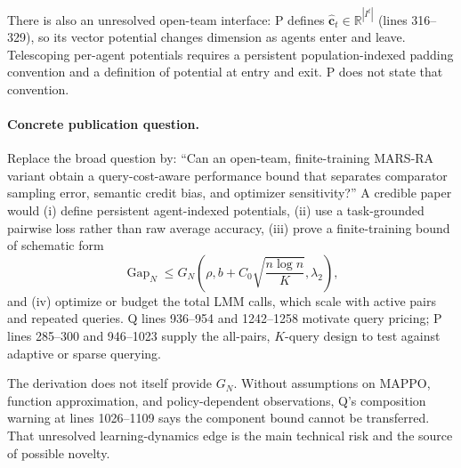 \documentclass{article}
\begin{document}
There is also an unresolved open-team interface: P defines
\(\widehat{\mathbf c}_t\in\mathbb R^{|I^t|}\) (lines 316--329), so its vector
potential changes dimension as agents enter and leave.  Telescoping per-agent
potentials requires a persistent population-indexed padding convention and a
definition of potential at entry and exit.  P does not state that convention.

\paragraph{Concrete publication question.}
Replace the broad question by: ``Can an open-team, finite-training MARS-RA
variant obtain a query-cost-aware performance bound that separates comparator
sampling error, semantic credit bias, and optimizer sensitivity?''  A credible
paper would (i) define persistent agent-indexed potentials, (ii) use a
task-grounded pairwise loss rather than raw average accuracy, (iii) prove a
finite-training bound of schematic form
\[
  \operatorname{Gap}_N
  \leq G_N\!\left(\rho,
  b+ C_0\sqrt{\frac{n\log n}{K}},\lambda_2\right),
\]
and (iv) optimize or budget the total LMM calls, which scale with active pairs
and repeated queries.  Q lines 936--954 and 1242--1258 motivate query pricing;
P lines 285--300 and 946--1023 supply the all-pairs, \(K\)-query design to test
against adaptive or sparse querying.

The derivation does not itself provide \(G_N\).  Without assumptions on MAPPO,
function approximation, and policy-dependent observations, Q's composition
warning at lines 1026--1109 says the component bound cannot be transferred.
That unresolved learning-dynamics edge is the main technical risk and the
source of possible novelty.
\end{document}
